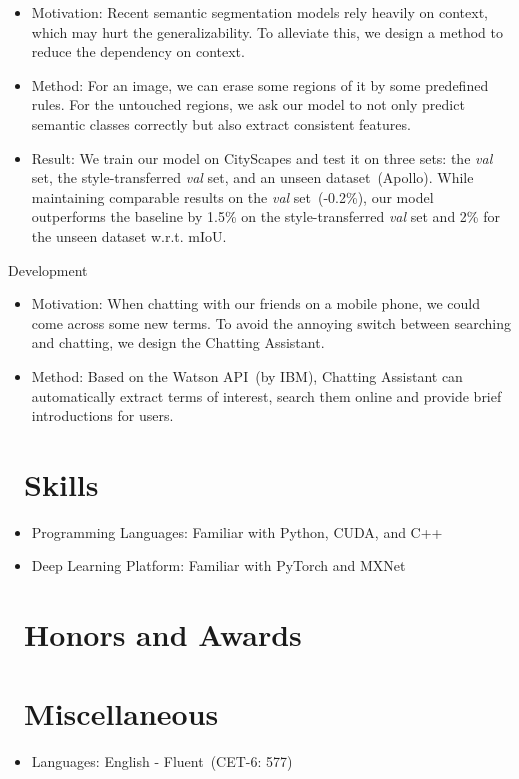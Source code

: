 \documentclass{resume}
\begin{document}
\begin{itemize}
	\item Motivation: Recent semantic segmentation models rely heavily on context, which may hurt the generalizability. To alleviate this, we design a method to reduce the dependency on context.
	\item Method: For an image, we can erase some regions of it by some predefined rules. For the untouched regions, we ask our model to not only predict semantic classes correctly but also extract consistent features.
	\item Result: We train our model on CityScapes and test it on three sets: the \textit{val} set, the style-transferred \textit{val} set, and an unseen dataset~(Apollo). While maintaining comparable results on the \textit{val} set~(-0.2\%), our model outperforms the baseline by 1.5\% on the style-transferred \textit{val} set and 2\% for the unseen dataset w.r.t. mIoU.
\end{itemize}

 {Development}
\begin{itemize}
	\item Motivation: When chatting with our friends on a mobile phone, we could come across some new terms. To avoid the annoying switch between searching and chatting, we design the Chatting Assistant. 
	\item Method: Based on the Watson API~(by IBM), Chatting Assistant can automatically extract terms of interest, search them online and provide brief introductions for users.
\end{itemize}



\section{\faCogs\ Skills}
\begin{itemize}[parsep=0.5ex]
  \item Programming Languages: Familiar with Python, CUDA, and C++
  \item Deep Learning Platform: Familiar with PyTorch and MXNet
\end{itemize}

\section{\faHeartO\ Honors and Awards}

\section{\faInfo\ Miscellaneous}
\begin{itemize}
  \item Languages: English - Fluent~(CET-6: 577)
\end{itemize}

%
%
\end{document}
